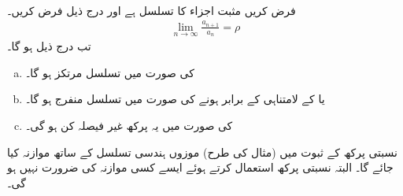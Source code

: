 \\
فرض کریں  مثبت اجزاء کا تسلسل ہے اور درج ذیل فرض کریں۔
\begin{align*}
\lim_{n\to\infty}\frac{a_{n+1}}{a_n}=\rho
\end{align*}
تب درج ذیل ہو گا۔
\begin{enumerate}[a.]
\item
{} کی صورت میں تسلسل مرتکز ہو گا۔
\item
{} یا    کے  لامتناہی کے برابر ہونے  کی صورت میں تسلسل منفرج ہو گا۔
\item
{} کی صورت میں یہ پرکھ غیر فیصلہ کن ہو گی۔
\end{enumerate}
نسبتی  پرکھ کے  ثبوت میں (مثال  کی طرح) موزوں ہندسی تسلسل کے ساتھ موازنہ کیا جائے گا۔ البتہ نسبتی پرکھ استعمال کرتے ہوئے ایسے کسی موازنہ کی ضرورت نہیں ہو گی۔
